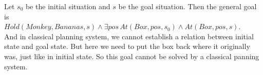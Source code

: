 \documentclass[12pt]{article}
\begin{document}
\begin{enumerate}
Let $s_0$ be the initial situation and $s$ be the goal situation. Then the general goal is \\
$Hold(Monkey, Bananas, s)\wedge\exists pos\, At(Box, pos, s_0)\wedge At(Box, pos, s)$. \\
And in classical planning system, we cannot establish a relation between initial state and goal state. But here we need to put the box back where it originally was, just like in initial state. So this goal cannot be solved by a classical panning system. 
\end{enumerate}
\end{document}
